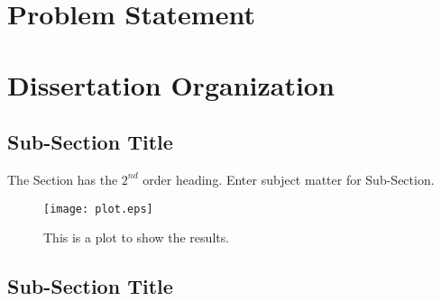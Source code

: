 {\section{Problem Statement}
\label{sec1.2}

\begin{comment}
{Ideally, chapter one defines the overall importance of the problem areas and provides an introduction into what you did, chapter two is why you did it in the context of what was previously known, three is how you did it, four is what you found and five is what it all means - putting the pieces together, (what's your contribution to the research field).
\end{comment}


\section{Dissertation Organization}
\label{sec1.3}

\subsection{Sub-Section Title}
\label{}

{The Section has the $2^{nd}$ order heading. Enter subject matter for Sub-Section.}


\begin{figure}[htb]
\centering
\texttt{[image: plot.eps]}
\caption{This is a plot to show the results.}
\label{fig:Plot}
\end{figure}


\subsection{Sub-Section Title}
\label{}

}
